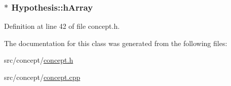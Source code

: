 \hypertarget{class_hypothesis_a2b381d29eb7a6101eda6fcd3a2e5380b}{
\subsubsection[{h\-Array}]{$\ast$ Hypothesis\-::h\-Array\hspace{0.3cm}{\ttfamily [private]}}}\label{class_hypothesis_a2b381d29eb7a6101eda6fcd3a2e5380b}


Definition at line 42 of file concept.\-h.



The documentation for this class was generated from the following files\-:\begin{DoxyCompactItemize}
\item 
src/concept/\hyperlink{concept_8h}{concept.\-h}\item 
src/concept/\hyperlink{concept_8cpp}{concept.\-cpp}\end{DoxyCompactItemize}
